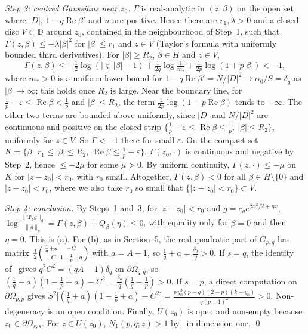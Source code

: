 \documentclass[11pt]{amsart}
\theoremstyle{definition}
\newcommand{\Rea}{\operatorname{Re}}
\newcommand{\bT}{\mathbf{T}}
\newcommand{\D}{\mathbb{D}}
\begin{document}
\emph{Step 3: centred Gaussians near $z_0$.} $\Gamma$ is real-analytic in $(z,\beta)$ on the open set where
$|D|$, $1-q\Rea\beta'$ and $n$ are positive. Hence there are $r_1,\lambda>0$ and a closed disc $V\subset\D$ around
$z_0$, contained in the neighbourhood of Step~1, such that $\Gamma(z,\beta)\le-\lambda|\beta|^2$ for $|\beta|\le r_1$ and $z\in V$ (Taylor's formula with uniformly
bounded third derivatives). For $|\beta|\ge R_2$, $\beta\in H$ and $z\in V$,
\[
\Gamma(z,\beta)\le-\tfrac12\log(|\varsigma||\beta|-1)+\tfrac1{2q}\log\tfrac1{m_*}+\tfrac1{2p}\log(1+p|\beta|)<-1,
\]
where $m_*>0$ is a uniform lower bound for $1-q\Rea\beta'=N/|D|^2\to\alpha_0/S=\delta_q$ as $|\beta|\to\infty$; this
holds once $R_2$ is large. Near the boundary line, for $\frac1p-\varepsilon\le\Rea\beta<\frac1p$ and
$|\beta|\le R_2$, the term $\frac1{2p}\log(1-p\Rea\beta)$ tends to $-\infty$. The other two terms are bounded above
uniformly, since $|D|$ and $N/|D|^2$ are continuous and positive on the closed strip
$\{\frac1p-\varepsilon\le\Rea\beta\le\frac1p,\ |\beta|\le R_2\}$, uniformly for $z\in V$. So $\Gamma<-1$
there for small $\varepsilon$. On the compact set $K=\{\beta:\ r_1\le|\beta|\le R_2,\ \Rea\beta\le\frac1p-\varepsilon\}$,
$\Gamma(z_0,\cdot)$ is continuous and negative by Step~2, hence $\le-2\mu$ for some $\mu>0$. By uniform
continuity, $\Gamma(z,\cdot)\le-\mu$ on $K$ for $|z-z_0|<r_0$, with $r_0$ small. Altogether, $\Gamma(z,\beta)<0$ for
all $\beta\in H\setminus\{0\}$ and $|z-z_0|<r_0$, where we also take $r_0$ so small that
$\{|z-z_0|<r_0\}\subset V$.

\emph{Step 4: conclusion.} By Steps~1 and~3, for $|z-z_0|<r_0$ and $g=c_ge^{\beta x^2/2+\eta x}$,
$\log\frac{\|\bT_zg\|_q}{\|g\|_p}=\Gamma(z,\beta)+Q_\beta(\eta)\le0$, with equality only for $\beta=0$ and then
$\eta=0$. This is (a). For (b), as in Section~5, the real quadratic part of $G_{p,q}$ has matrix
$\frac12\begin{psmallmatrix}\frac1q+a&-C\\-C&1-\frac1p+a\end{psmallmatrix}$ with $a=A-1$, so $\frac1q+a=\frac{\delta_q}q>0$.
If $s=q$, the identity of~\cite[Lemma~5.2]{DCH} gives $q^2C^2=(qA-1)\delta_q$ on $\partial\Omega_{q,q}$, so
$(\frac1q+a)(1-\frac1p+a)-C^2=\frac{\delta_q}q(\frac1q-\frac1p)>0$. If $s=p$, a direct computation on
$\partial\Omega_{p,p}$ gives $S^2\big[(\frac1q+a)(1-\frac1p+a)-C^2\big]=\frac{p\,y_0^3(p-q)(2-p)(k-y_0)}{q(p-1)^2}>0$.
Non-degeneracy is an open condition. Finally, $U(z_0)$ is open and non-empty because $z_0\in\partial\Omega_{s,s}$.
For $z\in U(z_0)$, $N_1(p,q;z)>1$ by~\cite[Theorem~1.1]{DCH} in dimension one. \qed
\end{document}
